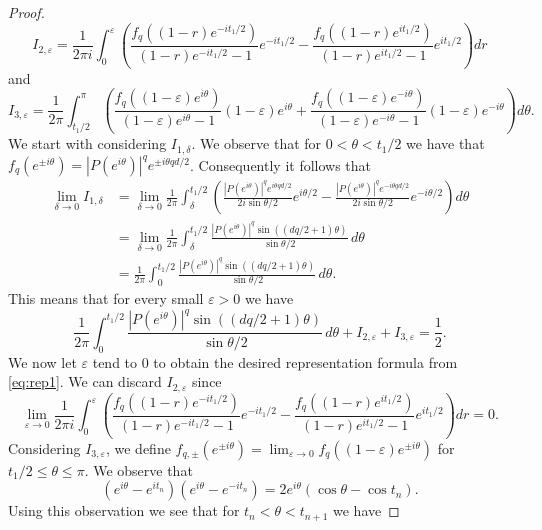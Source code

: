 \documentclass{amsart}
\theoremstyle{plain}
\theoremstyle{remark}
\begin{document}
\begin{proof}
		\[I_{2, \varepsilon}=\frac{1}{2 \pi i } \int_{0}^{\varepsilon} \left(\frac{f_q((1-r)e^{-i t_1/2})}{(1-r)e^{-i t_1/2}-1} e^{-i t_1/2} - \frac{f_q((1-r)e^{i t_1/2})}{(1-r)e^{i t_1/2}-1} e^{i t_1/2} \right) dr\]
		and
		\[I_{3, \varepsilon}=\frac{1}{2\pi}  \int_{t_1/2}^{\pi}\left( \frac{f_q((1-\varepsilon)e^{i \theta})}{(1-\varepsilon)e^{i\theta}-1}(1-\varepsilon)e^{i \theta} +\frac{f_q((1-\varepsilon)e^{-i \theta})}{(1-\varepsilon)e^{-i\theta}-1}(1-\varepsilon)e^{-i \theta} \right) d\theta.\]
		We start with considering $I_{1, \delta}$. We observe that for $0<\theta<t_1/2$ we have that $f_{q}(e^{\pm i \theta}) = |P(e^{i \theta})|^q e^{ \pm i \theta q d/2}$. Consequently it follows that 
		\[\begin{split}
			\lim_{ \delta \to 0} I_{1, \delta} &= \lim_{ \delta \to 0} \frac{1}{2 \pi}
			\int_{\delta}^{t_1/2} \left(\frac{|P(e^{i \theta})|^q e^{i \theta q d/2}}{2 i \sin \theta/2}e^{i \theta /2}- \frac{|P(e^{i \theta})|^q e^{-i \theta q d/2}}{2 i \sin \theta/2}e^{-i \theta /2} \right) d\theta \\ &=\lim_{ \delta \to 0} \frac{1}{2 \pi} \int_{\delta}^{t_1/2} \frac{|P(e^{i \theta})|^q \sin{((dq/2+1)\theta)}}{\sin \theta/2} \, d\theta \\
			&=\frac{1}{2 \pi} \int_{0}^{t_1/2} \frac{|P(e^{i \theta})|^q \sin{((dq/2+1)\theta)}}{\sin \theta/2 } \, d\theta.
		\end{split}\]
		This means that for every small $\varepsilon>0$ we have
		\begin{equation}\label{eq:rep1}
			\frac{1}{2 \pi} \int_{0}^{t_1/2} \frac{|P(e^{i \theta})|^q \sin{((dq/2+1)\theta)}}{\sin \theta/2} \, d\theta+I_{2, \varepsilon}+I_{3, \varepsilon}=\frac{1}{2}.
		\end{equation}
		We now let $\varepsilon$ tend to $0$ to obtain the desired representation formula from \eqref{eq:rep1}. We can discard $I_{2, \varepsilon}$ since
		\begin{equation}\label{eq:eps0}
			\lim_{\varepsilon \to 0} \frac{1}{2 \pi i } \int_{0}^{\varepsilon} \left(\frac{f_q((1-r)e^{-i t_1/2})}{(1-r)e^{-i t_1/2}-1} e^{-i t_1/2} - \frac{f_q((1-r)e^{i t_1/2})}{(1-r)e^{i t_1/2}-1} e^{i t_1/2} \right) dr=0.
		\end{equation}
		Considering $I_{3, \varepsilon}$, we define $f_{q, \pm}(e^{ \pm i \theta})=\lim_{\varepsilon \to 0} f_q((1-\varepsilon)e^{\pm i \theta})$ for $t_1/2 \leq \theta \leq \pi$. We observe that
		\[(e^{i \theta}-e^{it_n})(e^{i \theta}-e^{-it_n})=2e^{i \theta}(\cos \theta -\cos t_n).\]
		Using this observation we see that for $t_n<\theta<t_{n+1}$ we have

\end{proof}
\end{document}
